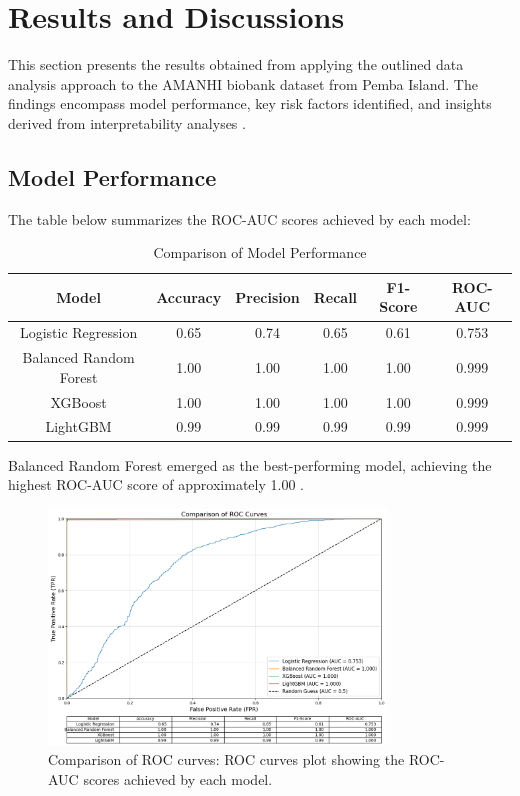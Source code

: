 \documentclass{article}
\begin{document}
\section{Results and Discussions}
This section presents the results obtained from applying the outlined data analysis approach to the AMANHI biobank dataset from Pemba Island. The findings encompass model performance, key risk factors identified, and insights derived from interpretability analyses \cite{aftab2021}.

\subsection{Model Performance}
The table below summarizes the ROC-AUC scores achieved by each model:
\begin{table}[h]
    \centering
    \caption{Comparison of Model Performance}
    \label{tab:performance}
    \begin{tabular}{cccccc}
        \toprule
        Model & Accuracy & Precision & Recall & F1-Score & ROC-AUC \\
        \midrule
        Logistic Regression & 0.65 & 0.74 & 0.65 & 0.61 & 0.753 \\
        Balanced Random Forest & 1.00 & 1.00 & 1.00 & 1.00 & 0.999 \\
        XGBoost & 1.00 & 1.00 & 1.00 & 1.00 & 0.999 \\
        LightGBM & 0.99 & 0.99 & 0.99 & 0.99 & 0.999 \\
        \bottomrule
    \end{tabular}
\end{table}

Balanced Random Forest emerged as the best-performing model, achieving the highest ROC-AUC score of approximately 1.00 \cite{aljameel2023}.
\begin{figure}[h]
    \centering
    \includegraphics[width=0.8\textwidth]{comparison of roc curves.png}
    \caption{Comparison of ROC curves: ROC curves plot showing the ROC-AUC scores achieved by each model.}
    \label{fig:shap_summary}
\end{figure}
\end{document}
